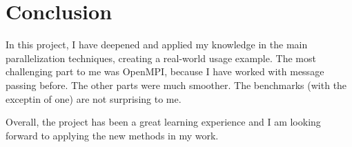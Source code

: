 \documentclass[a4paper,11pt]{article}
\begin{document}
\section{Conclusion}
In this project, I have deepened and applied my knowledge in the main
parallelization techniques, creating a real-world usage example. The most
challenging part to me was OpenMPI, because I have worked with message passing
before. The other parts were much smoother. The benchmarks (with the exceptin of
one) are not surprising to me.

Overall, the project has been a great learning experience and I am looking forward to applying the new
methods in my work.
\end{document}
